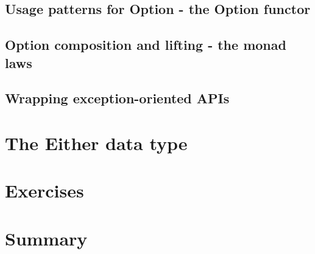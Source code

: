 \documentclass{beamer}
\begin{document}
\subsection{Usage patterns for Option - the Option functor}

\subsection{Option composition and lifting - the monad laws}

\subsection{Wrapping exception-oriented APIs}

\section{The Either data type}

\section{Exercises}

\section{Summary}

\begin{frame}{\secname}
\end{frame}
\end{document}

